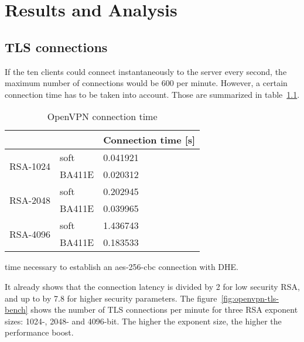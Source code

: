 \chapter{Results and Analysis}\label{chap:results}

\section{TLS connections}

If the ten clients could connect instantaneously to the server every second, the maximum number of connections would be 600 per minute.
However, a certain connection time has to be taken into account.
Those are summarized in table~\ref{tab:openvpn-con-time}.

\begin{table}[ht]
\center
\small
\begin{tabular}{ll|l|} \cline{3-3}
 & & Connection time [s] \\ \hline
\multicolumn{1}{|l|}{\multirow{2}{*}{RSA-1024}} & soft & 0.041921 \\ \cline{2-3}
\multicolumn{1}{|l|}{} & BA411E & 0.020312 \\ \hline
\multicolumn{1}{|l|}{\multirow{2}{*}{RSA-2048}} & soft & 0.202945 \\ \cline{2-3}
\multicolumn{1}{|l|}{} & BA411E & 0.039965 \\ \hline
\multicolumn{1}{|l|}{\multirow{2}{*}{RSA-4096}} & soft & 1.436743 \\ \cline{2-3}
\multicolumn{1}{|l|}{} & BA411E & 0.183533 \\ \hline
\end{tabular}
\caption{OpenVPN connection time}{time necessary to establish an aes-256-cbc connection with DHE.}
\label{tab:openvpn-con-time}
\end{table}

It already shows that the connection latency is divided by 2 for low security RSA, and up to by 7.8 for higher security parameters.
The figure~\ref{fig:openvpn-tls-bench} shows the number of TLS connections per minute for three RSA exponent sizes: 1024-, 2048- and 4096-bit.
The higher the exponent size, the higher the performance boost.


